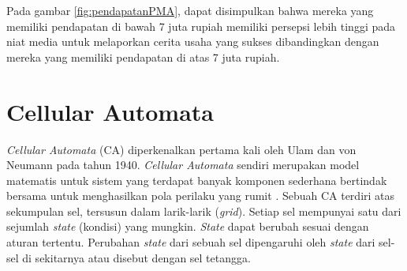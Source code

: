 \begin{enumerate}
Pada gambar \ref{fig:pendapatanPMA}, dapat disimpulkan bahwa mereka yang memiliki pendapatan di bawah 7 juta rupiah memiliki persepsi lebih tinggi pada niat media untuk melaporkan cerita usaha yang sukses dibandingkan dengan mereka yang memiliki pendapatan di atas 7 juta rupiah.
\end{enumerate}

\section{Cellular Automata}
\label{sec:cellularautomata}

\textit{Cellular Automata} (CA) diperkenalkan pertama kali oleh Ulam dan von Neumann pada tahun 1940. \textit{Cellular Automata} sendiri merupakan model matematis untuk sistem yang terdapat banyak komponen sederhana bertindak bersama untuk menghasilkan pola perilaku yang rumit \cite{referensiCA2}. Sebuah CA terdiri atas sekumpulan sel, tersusun dalam larik-larik (\textit{grid}). Setiap sel mempunyai satu dari sejumlah \textit{state} (kondisi) yang mungkin. \textit{State} dapat berubah sesuai dengan aturan tertentu. Perubahan \textit{state} dari sebuah sel dipengaruhi oleh \textit{state} dari sel-sel di sekitarnya atau disebut dengan sel tetangga.

